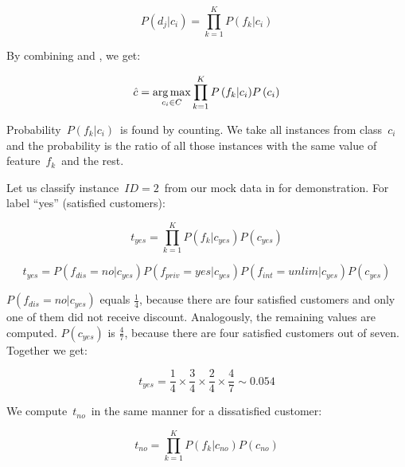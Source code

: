 \begin{equation}
	\label{eq:posterios}
	P\left(d_j  | c_i \right) = \prod_{k=1}^{K}
	{P\left(  f_k  | c_i \right)}
\end{equation}

By combining  and , we get:

\begin{equation}
	\hat{c} = \operatorname*{arg\,max}_{c_i \in C}
	\prod_{k=1}^{K}
	{P\left(  f_k  | c_i \right)}
	P\left( c_i \right)
\end{equation}

Probability~$P\left(f_k|c_i\right)$~is found by counting.
We take all instances from class~$c_i$ and the probability is the ratio of all those instances with the same value of feature~$f_k$~and the rest.\

Let us classify instance~$\mathit{ID}=2$~from our mock data in  for demonstration.
For label ``yes'' (satisfied customers):

\begin{equation}
	t_{yes} = 
	\prod_{k=1}^{K}
	{P\left(  f_k  | c_{yes} \right)}
	P\left( c_{yes} \right)
\end{equation}

\begin{equation}
	t_{yes} = 
	P\left(  f_{dis} = no | c_{yes} \right)
	P\left(  f_{priv} = yes | c_{yes} \right)
	P\left(  f_{int} = unlim | c_{yes} \right)
	P\left( c_{yes} \right)
\end{equation}

$P\left(  f_{dis} = no | c_{yes} \right)$ equals $\frac{1}{4}$, because there are four satisfied customers
and only one of them did not receive discount.
Analogously, the remaining values are computed.
$P\left( c_{yes} \right)$ is $\frac{4}{7}$, because there are four satisfied customers out of seven.
Together we get:

\begin{equation}
	t_{yes} = 
	\frac{1}{4} \times
	\frac{3}{4} \times
	\frac{2}{4} \times
	\frac{4}{7}
	\sim 0.054
\end{equation}

We compute~$t_{no}$~in the same manner for a dissatisfied customer:

\begin{equation}
	t_{no} = 
	\prod_{k=1}^{K}
	{P\left(  f_k  | c_{no} \right)}
	P\left( c_{no} \right)
\end{equation}

